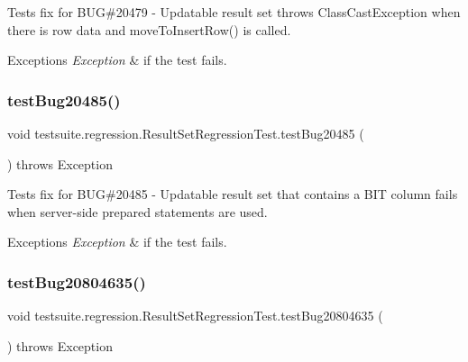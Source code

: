 Tests fix for B\+UG\#20479 -\/ Updatable result set throws Class\+Cast\+Exception when there is row data and move\+To\+Insert\+Row() is called.


\begin{DoxyExceptions}{Exceptions}
{\em Exception} & if the test fails. \\
\hline
\end{DoxyExceptions}
\mbox{\label{classtestsuite_1_1regression_1_1_result_set_regression_test_a5e674e0b217a2731be3be70fa79f0007}} 
\subsubsection{\texorpdfstring{test\+Bug20485()}{testBug20485()}}
{\footnotesize\ttfamily void testsuite.\+regression.\+Result\+Set\+Regression\+Test.\+test\+Bug20485 (\begin{DoxyParamCaption}{ }\end{DoxyParamCaption}) throws Exception}

Tests fix for B\+UG\#20485 -\/ Updatable result set that contains a B\+IT column fails when server-\/side prepared statements are used.


\begin{DoxyExceptions}{Exceptions}
{\em Exception} & if the test fails. \\
\hline
\end{DoxyExceptions}
\mbox{\label{classtestsuite_1_1regression_1_1_result_set_regression_test_a73eb842a830acedbf8af195858dfc58f}} 
\subsubsection{\texorpdfstring{test\+Bug20804635()}{testBug20804635()}}
{\footnotesize\ttfamily void testsuite.\+regression.\+Result\+Set\+Regression\+Test.\+test\+Bug20804635 (\begin{DoxyParamCaption}{ }\end{DoxyParamCaption}) throws Exception}

